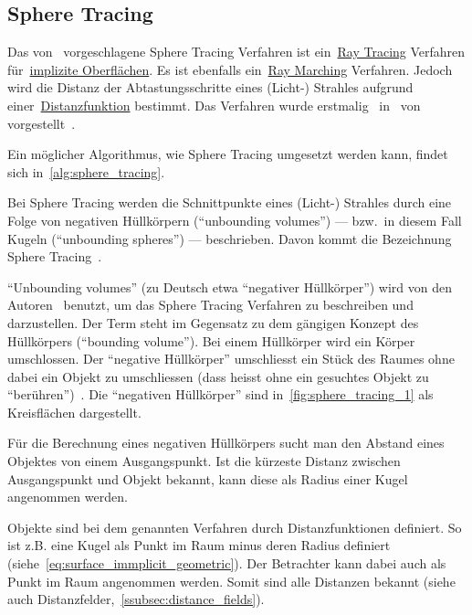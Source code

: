
\subsection{Sphere Tracing}
\label{subsec:sphere_tracing}

Das von~\citeauthor{hart_sphere_1994} vorgeschlagene Sphere Tracing
Verfahren ist ein~\hyperref[subsec:ray_tracing]{Ray Tracing} Verfahren
für~\hyperref[subsec:implicit_surfaces]{implizite Oberflächen}. Es ist
ebenfalls ein~\hyperref[subsec:ray_marching]{Ray Marching} Verfahren.
Jedoch wird die Distanz der Abtastungsschritte eines (Licht-) Strahles
aufgrund einer~\hyperref[ssubsec:distance_functions]{Distanzfunktion}
bestimmt.
Das Verfahren wurde erstmalig~\citeyear{hart_ray_1989}
in~ von~\citeauthor{hart_ray_1989}
vorgestellt~\parencite{hart_ray_1989}.

Ein möglicher Algorithmus, wie Sphere Tracing umgesetzt werden kann,
findet sich in~\autoref{alg:sphere_tracing}.

Bei Sphere Tracing werden die Schnittpunkte eines (Licht-) Strahles
durch eine Folge von negativen Hüllkörpern (``unbounding volumes'') ---
bzw.\ in diesem Fall Kugeln (``unbounding spheres'') --- beschrieben.
Davon kommt die Bezeichnung Sphere Tracing~\parencite[S.
530]{hart_sphere_1994}.

``Unbounding volumes'' (zu Deutsch etwa ``negativer Hüllkörper'') wird
von den Autoren~\citeauthor{hart_ray_1989} benutzt, um das Sphere
Tracing Verfahren zu beschreiben und darzustellen. Der Term steht im
Gegensatz zu dem gängigen Konzept des Hüllkörpers (``bounding volume'').
Bei einem Hüllkörper wird ein Körper umschlossen. Der ``negative
Hüllkörper'' umschliesst ein Stück des Raumes ohne dabei ein Objekt zu
umschliessen (dass heisst ohne ein gesuchtes Objekt zu
``berühren'')~\parencite[S. 291]{hart_ray_1989}. Die ``negativen
Hüllkörper'' sind in~\autoref{fig:sphere_tracing_1} als Kreisflächen
dargestellt.

Für die Berechnung eines negativen Hüllkörpers sucht man
den Abstand eines Objektes von einem Ausgangspunkt.
Ist die kürzeste Distanz zwischen Ausgangspunkt und
Objekt bekannt, kann diese als Radius einer Kugel angenommen werden. 

Objekte sind bei dem genannten Verfahren durch Distanzfunktionen
definiert. So ist z.B. eine Kugel als Punkt im Raum minus deren Radius
definiert (siehe~\autoref{eq:surface_immplicit_geometric}). Der
Betrachter kann dabei auch als Punkt im Raum angenommen werden. Somit
sind alle Distanzen bekannt (siehe auch
Distanzfelder,~\autoref{ssubsec:distance_fields}).

